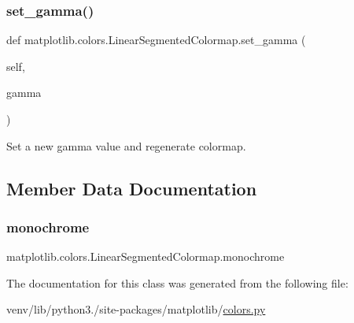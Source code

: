 \subsubsection{\texorpdfstring{set\+\_\+gamma()}{set\_gamma()}}
{\footnotesize\ttfamily def matplotlib.\+colors.\+Linear\+Segmented\+Colormap.\+set\+\_\+gamma (\begin{DoxyParamCaption}\item[{}]{self,  }\item[{}]{gamma }\end{DoxyParamCaption})}

\begin{DoxyVerb}Set a new gamma value and regenerate colormap.\end{DoxyVerb}
 

\subsection{Member Data Documentation}
\mbox{\label{classmatplotlib_1_1colors_1_1LinearSegmentedColormap_a048b8576cc8ff2dc1e87b6ac6320eedb}} 
\subsubsection{\texorpdfstring{monochrome}{monochrome}}
{\footnotesize\ttfamily matplotlib.\+colors.\+Linear\+Segmented\+Colormap.\+monochrome}



The documentation for this class was generated from the following file\+:\begin{DoxyCompactItemize}
\item 
venv/lib/python3./site-\/packages/matplotlib/\hyperlink{colors_8py}{colors.\+py}\end{DoxyCompactItemize}
